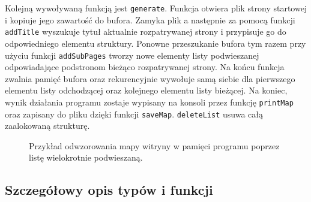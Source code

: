 \documentclass[12pt,a4paper,twoside]{article}
\begin{document}
Kolejną wywoływaną funkcją jest \lstinline|generate|.
Funkcja otwiera plik strony startowej i kopiuje jego zawartość do bufora. Zamyka plik a następnie za pomocą funkcji \lstinline|addTitle| wyszukuje tytuł aktualnie rozpatrywanej strony i przypisuje go do odpowiedniego elementu struktury. Ponowne przeszukanie bufora tym razem przy użyciu funkcji \lstinline|addSubPages| tworzy nowe elementy listy podwieszanej odpowiadające podstronom bieżąco rozpatrywanej strony. Na końcu funkcja zwalnia pamięć bufora oraz rekurencyjnie wywołuje samą siebie dla pierwszego elementu listy odchodzącej oraz kolejnego elementu listy bieżącej. Na koniec, wynik działania programu zostaje wypisany na konsoli przez funkcję \lstinline|printMap|  oraz zapisany do pliku dzięki funkcji \lstinline|saveMap|. \lstinline|deleteList| usuwa całą zaalokowaną strukturę.

\begin{figure}
\centering
{}
\caption{Przykład odwzorowania mapy witryny w pamięci programu poprzez listę wielokrotnie podwieszaną.}

\label{fig:graf}
\end{figure} 


\subsection{Szczegółowy opis typów i funkcji}
\end{document}
